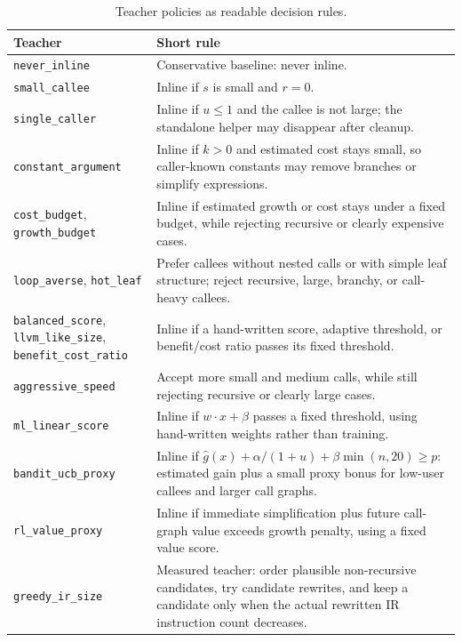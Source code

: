 \documentclass[12pt, a4paper]{report}
\begin{document}
\begin{table}[H]
\centering
{\footnotesize
\setlength{\tabcolsep}{3pt}
\begin{tabular}{|p{}|p{}|}
\hline
Teacher & Short rule \\
\hline
\texttt{never\_inline} & Conservative baseline: never inline. \\
\hline
\texttt{small\_callee} & Inline if \(s\) is small and \(r=0\). \\
\hline
\texttt{single\_caller} & Inline if \(u\le1\) and the callee is not large; the
standalone helper may disappear after cleanup. \\
\hline
\texttt{constant\_argument} & Inline if \(k>0\) and estimated cost stays small,
so caller-known constants may remove branches or simplify expressions. \\
\hline
\texttt{cost\_budget}, \texttt{growth\_budget} & Inline if estimated growth
or cost stays under a fixed budget, while rejecting recursive or clearly
expensive cases. \\
\hline
\texttt{loop\_averse}, \texttt{hot\_leaf} & Prefer callees without nested calls
or with simple leaf structure; reject recursive, large, branchy, or call-heavy
callees. \\
\hline
\texttt{balanced\_score}, \texttt{llvm\_like\_size},
\texttt{benefit\_cost\_ratio} & Inline if a hand-written score, adaptive
threshold, or benefit/cost ratio passes its fixed threshold. \\
\hline
\texttt{aggressive\_speed} & Accept more small and medium calls, while still
rejecting recursive or clearly large cases. \\
\hline
\texttt{ml\_linear\_score} & Inline if \(w\cdot x+\beta\) passes a fixed
threshold, using hand-written weights rather than training. \\
\hline
\texttt{bandit\_ucb\_proxy} & Inline if
\(\widehat{g}(x)+\alpha/(1+u)+\beta\min(n,20)\ge p\): estimated gain plus a
small proxy bonus for low-user callees and larger call graphs. \\
\hline
\texttt{rl\_value\_proxy} & Inline if immediate simplification plus future
call-graph value exceeds growth penalty, using a fixed value score. \\
\hline
\texttt{greedy\_ir\_size} & Measured teacher: order plausible non-recursive
candidates, try candidate rewrites, and keep a candidate only when the actual
rewritten IR instruction count decreases. \\
\hline
\end{tabular}%
}
\caption{Teacher policies as readable decision rules.}
\label{tab:teacher-policies-readable}
\end{table}
\end{document}
